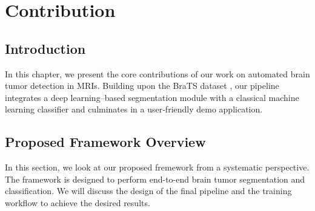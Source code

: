 \chapter{Contribution}

\section{Introduction}
\label{sec:contribution-introduction}

In this chapter, we present the core contributions of our work on automated brain tumor detection in MRIs. Building upon the BraTS dataset \cite{Menze2015}, our pipeline integrates a deep learning–based segmentation module with a classical machine learning classifier and culminates in a user‐friendly demo application.

\section{Proposed Framework Overview}
\label{sec:contribution-framework}
In this section, we look at our proposed fremework from a systematic perspective. The framework is designed to perform end-to-end brain tumor segmentation and classification. We will discuss the design of the final pipeline and the training workflow to achieve the desired results.


